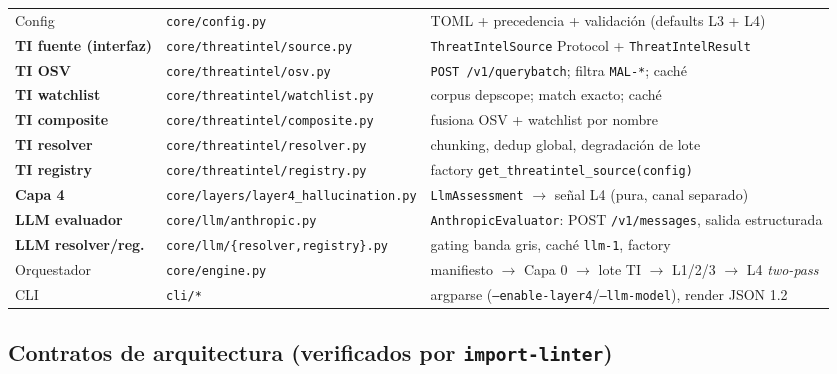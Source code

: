 \documentclass[11pt,a4paper]{article}
\begin{document}
\begin{center}
\begin{tabular}{@{}lll@{}}
Config & \texttt{core/config.py} & TOML + precedencia + validación (defaults L3 + L4) \\
\textbf{TI fuente (interfaz)} & \texttt{core/threatintel/source.py} & \texttt{ThreatIntelSource} Protocol + \texttt{ThreatIntelResult} \\
\textbf{TI OSV} & \texttt{core/threatintel/osv.py} & \texttt{POST /v1/querybatch}; filtra \texttt{MAL-*}; caché \\
\textbf{TI watchlist} & \texttt{core/threatintel/watchlist.py} & corpus depscope; match exacto; caché \\
\textbf{TI composite} & \texttt{core/threatintel/composite.py} & fusiona OSV + watchlist por nombre \\
\textbf{TI resolver} & \texttt{core/threatintel/resolver.py} & chunking, dedup global, degradación de lote \\
\textbf{TI registry} & \texttt{core/threatintel/registry.py} & factory \texttt{get\_threatintel\_source(config)} \\
\textbf{Capa 4} & \texttt{core/layers/layer4\_hallucination.py} & \texttt{LlmAssessment} $\rightarrow$ señal L4 (pura, canal separado) \\
\textbf{LLM evaluador} & \texttt{core/llm/anthropic.py} & \texttt{AnthropicEvaluator}: POST \texttt{/v1/messages}, salida estructurada \\
\textbf{LLM resolver/reg.} & \texttt{core/llm/\{resolver,registry\}.py} & gating banda gris, caché \texttt{llm-1}, factory \\
Orquestador & \texttt{core/engine.py} & manifiesto $\rightarrow$ Capa 0 $\rightarrow$ lote TI $\rightarrow$ L1/2/3 $\rightarrow$ L4 \emph{two-pass} \\
CLI & \texttt{cli/*} & argparse (\texttt{--enable-layer4}/\texttt{--llm-model}), render JSON 1.2 \\
\bottomrule
\end{tabular}
\end{center}

\subsection{Contratos de arquitectura (verificados por \texttt{import-linter})}
\end{document}
